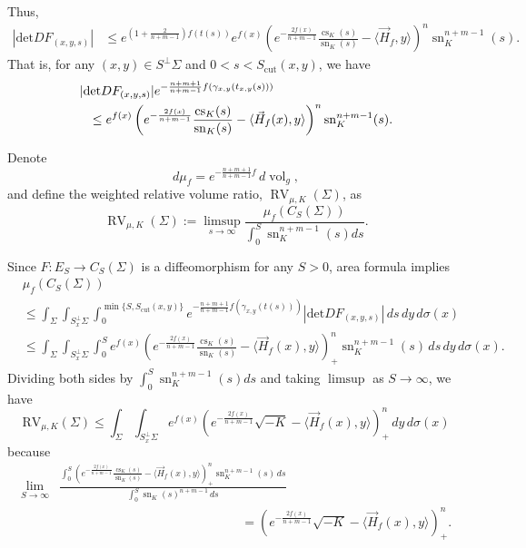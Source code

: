 \documentclass[psamsfonts]{amsart}
\theoremstyle{definition}
\theoremstyle{remark}
\newcommand{\vol}{\mbox{vol}}
\numberwithin{equation}{section}
\begin{document}
Thus,
\begin{align*}
    |\mathrm{det} DF_{(x,y,s)}| &\leq e^{\left( 1 + \frac{2}{n+m-1}\right)f(t(s))}e^{f(x)}\left(e^{-\frac{2f(x)}{n+m-1}}\frac{\operatorname{cs}_K(s)}{\operatorname{sn}_K(s)} - \langle \vec H_f, y \rangle \right)^n \operatorname{sn}_K^{n+m-1}(s).
\end{align*}
That is, for any $(x,y) \in S^\perp \Sigma$ and $0< s< S_{\mathrm{cut}}(x,y)$, we have
\begin{eqnarray}
 \lefteqn{   
|\mathrm{det} DF_{(x,y,s)}| e^{-\frac{n+m+1}{n+m-1}f(\gamma_{x,y}(t_{x,y}(s)))} }\\ 
& & \leq 
e^{f(x)}\left(e^{-\frac{2f(x)}{n+m-1}}\frac{\operatorname{cs}_K(s)}{\operatorname{sn}_K(s)} -  \langle \vec H_f(x), y \rangle \right)^n \operatorname{sn}_K^{n+m-1}(s). \nonumber
\end{eqnarray}

Denote $$d\mu_f = e^{-\frac{n+m+1}{n+m-1}f}\, d \operatorname{vol}_g, $$
and define the weighted relative volume ratio, $\operatorname{RV}_{\mu,K}(\Sigma)$,  as
\begin{equation} \operatorname{RV}_{\mu,K}(\Sigma):= \limsup_{s \to \infty} \frac{\mu_f(C_S(\Sigma))}{\int_0^S \operatorname{sn}_K^{n+m-1}(s)ds }. 
\label{Volume ratio}
\end{equation}

Since $F:E_S \to C_S(\Sigma)$ is a diffeomorphism for any $S>0$, area formula implies
\begin{align}
        &\mu_f ( C_S(\Sigma)) \nonumber\\
        &\leq \int_\Sigma \int_{ S^\perp_x\Sigma}\int_0^{\min\{S, S_{\mathrm{cut}} (x,y)\}} e^{-\frac{n+m+1}{n+m-1} f(\gamma_{x,y}(t(s)))}|\mathrm{det} DF_{(x,y,s)}|\,ds \,dy\, d\sigma(x)\label{area-formula}\\
        & \leq \int_\Sigma \int_{ S^\perp_x\Sigma}\int_0^{S} e^{f(x)}
\left( e^{-\frac{2f(x)}{n+m-1}}
\frac{\operatorname{cs}_K(s)}{\operatorname{sn}_K(s)} - \langle \vec H_f (x), y \rangle 
\right)_+^n
\operatorname{sn}_K^{n+m-1}(s)\,ds \,dy\, d\sigma(x)\nonumber.
\end{align}
Dividing both sides by $\int_0^S \operatorname{sn}_K^{n+m-1}(s)ds$ and taking $\limsup$ as $S \to \infty$, we have
$$\mathrm{RV}_{\mu, K}(\Sigma) \leq
\int_\Sigma \int_{ S^\perp_x\Sigma}e^{f(x)} \left( e^{-\frac{2f(x)}{n+m-1}}\sqrt{-K} -\langle  \vec H_f (x), y \rangle \right)^n_+
 \,dy\, d\sigma(x)$$
because
\begin{align*}
\lim_{S\to\infty}&
\frac{
\displaystyle
\int_0^S
\left(e^{-\frac{2f(x)}{n+m-1}}
\frac{\operatorname{cs}_K(s)}{\operatorname{sn}_K(s)}- \langle  \vec H_f (x), y \rangle 
\right)_+^n
\operatorname{sn}_K^{n+m-1}(s)\,ds
}{
\displaystyle
\int_0^S \operatorname{sn}_K(s)^{n+m-1}\,ds
}\\
&\hspace{6cm}
=
\left( e^{-\frac{2f(x)}{n+m-1}}
\sqrt{-K} - \langle \vec H_f (x) , y \rangle 
\right)_+^n.
\end{align*}
\end{document}

